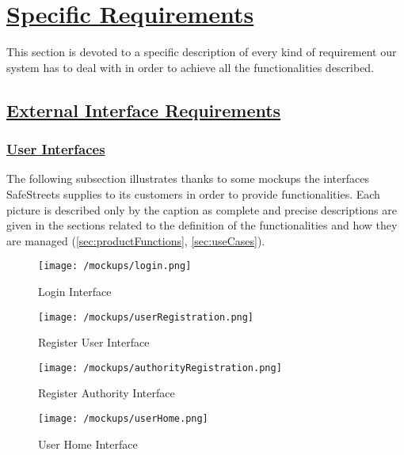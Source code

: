 \section[Specific Requirements]{\hyperlink{toc}{Specific Requirements}}
	\label{sec:specificRequirements}
	This section is devoted to a specific description of every kind of requirement our system has to deal with in order to achieve all the functionalities described.

\subsection[External Interface Requirements]{\hyperlink{toc}{External Interface Requirements}}
	\label{sec:externalInterfaceRequirements}
	\subsubsection[User Interfaces]{\hyperlink{toc}{User Interfaces}}
	\label{sec:userInterfaces}
	The following subsection illustrates thanks to some mockups the interfaces SafeStreets supplies to its customers in order to provide functionalities. Each picture is described only by the caption as complete and precise descriptions are given in the sections related to the definition of the functionalities and how they are managed (\ref{sec:productFunctions}, \ref{sec:useCases}).
	
	\begin{figure}[h]
		\centering
		\begin{minipage}{0.5\textwidth}
			\centering
			\texttt{[image: /mockups/login.png]}
			\caption{Login Interface}
		\end{minipage}\hfill
		\begin{minipage}{0.5\textwidth}
			\centering
			\texttt{[image: /mockups/userRegistration.png]}
			\caption{Register User Interface}
		\end{minipage}
	\end{figure}

	\begin{figure}[h]
		\centering
		\begin{minipage}{0.5\textwidth}
			\centering
			\texttt{[image: /mockups/authorityRegistration.png]}
			\caption{Register Authority Interface}
		\end{minipage}\hfill
		\begin{minipage}{0.5\textwidth}
			\centering
			\texttt{[image: /mockups/userHome.png]}
			\caption{User Home Interface}
		\end{minipage}
	\end{figure}

